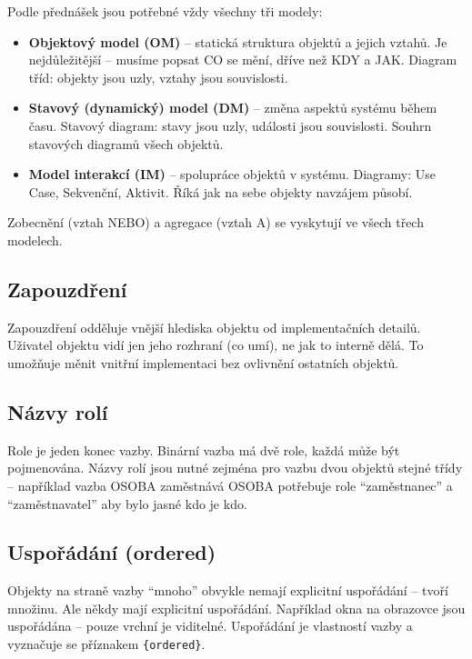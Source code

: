 \documentclass[12pt, a4paper]{article}
\begin{document}
Podle přednášek jsou potřebné vždy všechny tři modely:

\begin{itemize}
  \item \textbf{Objektový model (OM)} -- statická struktura objektů a jejich vztahů. Je nejdůležitější -- musíme popsat CO se mění, dříve než KDY a JAK. Diagram tříd: objekty jsou uzly, vztahy jsou souvislosti.
  \item \textbf{Stavový (dynamický) model (DM)} -- změna aspektů systému během času. Stavový diagram: stavy jsou uzly, události jsou souvislosti. Souhrn stavových diagramů všech objektů.
  \item \textbf{Model interakcí (IM)} -- spolupráce objektů v systému. Diagramy: Use Case, Sekvenční, Aktivit. Říká jak na sebe objekty navzájem působí.
\end{itemize}

Zobecnění (vztah NEBO) a agregace (vztah A) se vyskytují ve všech třech modelech.

\subsection{Zapouzdření}

Zapouzdření odděluje vnější hlediska objektu od implementačních detailů. Uživatel objektu vidí jen jeho rozhraní (co umí), ne jak to interně dělá. To umožňuje měnit vnitřní implementaci bez ovlivnění ostatních objektů.

\subsection{Názvy rolí}

Role je jeden konec vazby. Binární vazba má dvě role, každá může být pojmenována. Názvy rolí jsou nutné zejména pro vazbu dvou objektů stejné třídy -- například vazba OSOBA zaměstnává OSOBA potřebuje role ``zaměstnanec'' a ``zaměstnavatel'' aby bylo jasné kdo je kdo.

\subsection{Uspořádání (ordered)}

Objekty na straně vazby ``mnoho'' obvykle nemají explicitní uspořádání -- tvoří množinu. Ale někdy mají explicitní uspořádání. Například okna na obrazovce jsou uspořádána -- pouze vrchní je viditelné. Uspořádání je vlastností vazby a vyznačuje se příznakem \texttt{\{ordered\}}.
\end{document}

